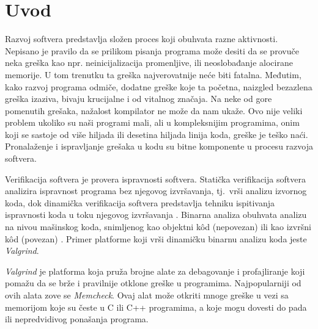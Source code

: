 \documentclass[12pt,oneside]{memoir}
\theoremstyle{plain}
\theoremstyle{definition}
\begin{document}
\frontmatter
\naslovna
\komisija
\apstrakt
\tableofcontents*

\mainmatter

\chapter{Uvod}
Razvoj softvera predstavlja složen proces koji obuhvata razne aktivnosti. Nepisano je pravilo da se prilikom pisanja programa može desiti da se provuče neka greška kao npr. neinicijalizacija promenljive, ili neoslobađanje alocirane memorije. U tom trenutku ta greška najverovatnije neće biti fatalna. Međutim, kako razvoj programa odmiče, dodatne greške koje ta početna, naizgled bezazlena greška izaziva, bivaju krucijalne i od vitalnog značaja. Na neke od gore pomenutih grešaka, nažalost kompilator ne može da nam ukaže. Ovo nije veliki problem ukoliko su naši programi mali, ali u  kompleksnijim programima, onim koji se sastoje od više hiljada ili desetina hiljada linija koda, greške je teško naći. Pronalaženje i ispravljanje grešaka u kodu su bitne komponente u procesu razvoja softvera.

Verifikacija softvera je provera ispravnosti softvera. Statička verifikacija softvera analizira ispravnost programa bez njegovog izvršavanja, tj.~vrši analizu izvornog koda, dok dinamička verifikacija softvera predstavlja tehniku ispitivanja ispravnosti koda u toku njegovog izvršavanja \cite{02Motivacija}. Binarna analiza obuhvata analizu na nivou mašinskog koda, snimljenog kao objektni k\^od (nepovezan) ili kao izvršni k\^od (povezan) \cite{03DinamickaAnaliza}. Primer platforme koji vrši dinamičku binarnu analizu koda jeste \textit{Valgrind}.  

\textit{Valgrind} je platforma koja pruža brojne alate za debagovanje i profajliranje koji pomažu da se brže i pravilnije otklone greške u programima. Najpopularniji od ovih alata zove se \textit{Memcheck}. Ovaj alat može otkriti mnoge greške u vezi sa memorijom koje su česte u C ili C++ programima, a koje mogu dovesti do pada ili nepredvidivog ponašanja programa. 
\end{document}

